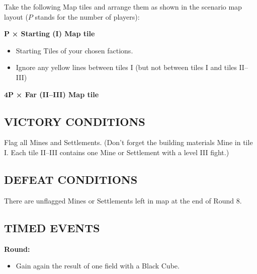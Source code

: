 \begin{multicols*}{2}
Take the following Map tiles and arrange them as shown in the scenario map layout ($P$ stands for the number of players):

$\boldsymbol{P}$ \textbf{× Starting (I) Map tile}
\begin{itemize}
  \item Starting Tiles of your chosen factions.
  \item Ignore any yellow lines between tiles I (but not between tiles I and tiles II--III)
\end{itemize}

$\boldsymbol{4 P}$ \textbf{× Far (II--III) Map tile}

\subsection*{\MakeUppercase{Victory Conditions}}

Flag all Mines and Settlements. (Don't forget the building materials Mine in tile I. Each tile II--III contains one Mine or Settlement with a level III fight.)

\subsection*{\MakeUppercase{Defeat Conditions}}

There are unflagged Mines or Settlements left in map at the end of Round 8.

\subsection*{\MakeUppercase{Timed Events}}

\textbf{ Round:}
\begin{itemize}
  \item Gain again the result of one field with a Black Cube.
\end{itemize}


\end{multicols*}
